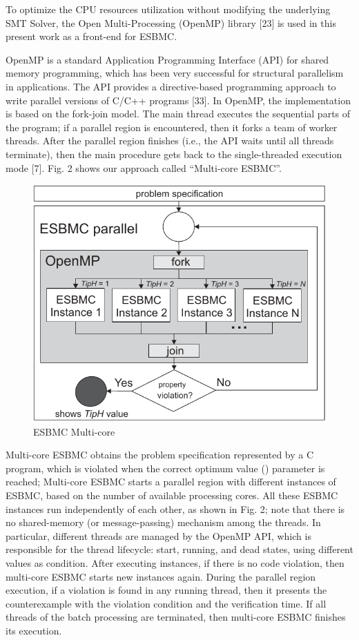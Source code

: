 To optimize the CPU resources utilization without modifying the underlying SMT Solver, the Open Multi-Processing (OpenMP) library [23] is used in this present work as a front-end for ESBMC.

OpenMP is a standard Application Programming Interface (API) for shared memory programming, which has been very successful for structural parallelism in applications. The API provides a directive-based programming approach to write parallel versions of C/C++ programs [33]. In OpenMP, the implementation is based on the fork-join model. The main thread executes the sequential parts of the program; if a parallel region is encountered, then it forks a team of worker threads. After the parallel region finishes (i.e., the API waits until all threads terminate), then the main procedure gets back to the single-threaded execution mode [7]. Fig. 2 shows our approach called “Multi-core ESBMC”.
\begin{figure}[ht]
	\centering
  \includegraphics[scale=0.75]{Image/esbmc-parallel.pdf} 
	\caption{ESBMC Multi-core}
\end{figure}

Multi-core ESBMC obtains the problem specification represented by a C program, which is violated when the correct optimum value () parameter is reached; Multi-core ESBMC starts a parallel region with  different instances of ESBMC, based on the number of available processing cores. All these ESBMC instances run independently of each other, as shown in Fig. 2; note that there is no shared-memory (or message-passing) mechanism among the threads. In particular, different threads are managed by the OpenMP API, which is responsible for the thread lifecycle: start, running, and dead states, using different  values as condition. After executing  instances, if there is no code violation, then multi-core ESBMC starts  new instances again. During the parallel region execution, if a violation is found in any running thread, then it presents the counterexample with the violation condition and the verification time. If all threads of the batch processing are terminated, then multi-core ESBMC finishes its execution.


